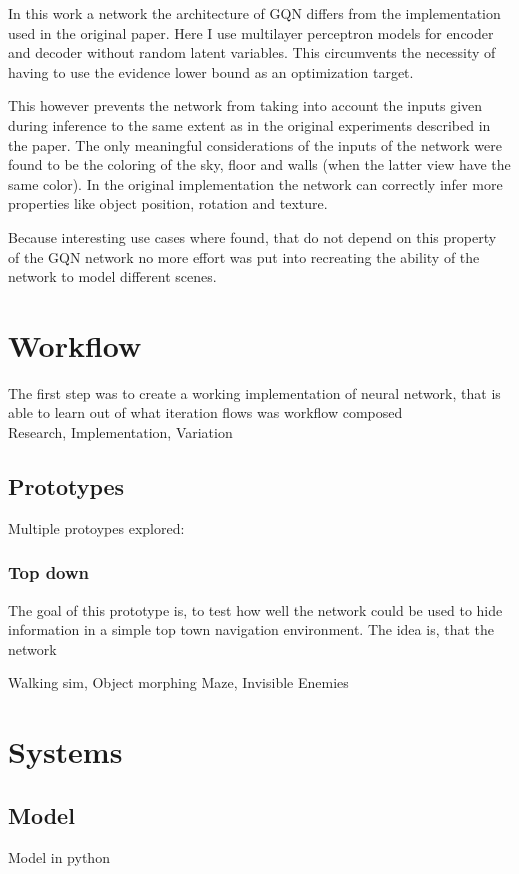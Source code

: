 \documentclass[a4paper, twoside, 10pt]{report}
\begin{document}
In this work a network the architecture of GQN differs from the implementation used in the original paper. Here I use multilayer perceptron models for encoder and decoder without random latent variables. This circumvents the necessity of having to use the evidence lower bound as an optimization target.

This however prevents the network from taking into account the inputs given during inference to the same extent as in the original experiments described in the paper. The only meaningful considerations of the inputs of the network were found to be the coloring of the sky, floor and walls (when the latter view have the same color). In the original implementation the network can correctly infer more properties like object position, rotation and texture.

Because interesting use cases where found, that do not depend on this property of the GQN network no more effort was put into recreating the ability of the network to model different scenes.



\chapter{Workflow}
The first step was to create a working implementation of neural network, that is able to learn
out of what iteration flows was workflow composed \\
Research, Implementation, Variation

\section{Prototypes}
Multiple protoypes explored:

\subsection{Top down}
The goal of this prototype is, to test how well the network could be used to hide information in a simple top town navigation environment.
The idea is, that the network

Walking sim,
Object morphing
Maze,
Invisible Enemies



\chapter{Systems}
\section{Model}
Model in python
\end{document}
